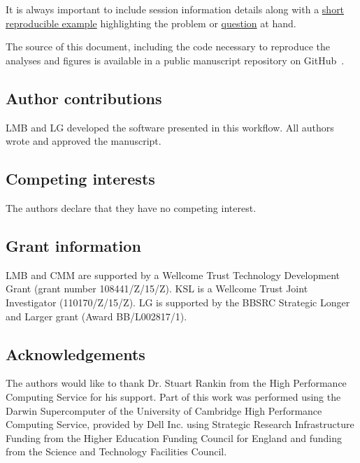 \begin{knitrout}
\color{fgcolor}\begin{kframe}
\begin{alltt}
\hlstd{(}\hlstd{)}
\hlstd{()}
\end{alltt}
\end{kframe}
\end{knitrout}

It is always important to include session information details along
with a \href{http://adv-r.had.co.nz/Reproducibility.html}{short
  reproducible example} highlighting the problem or
\href{https://support.bioconductor.org/}{question} at hand.

The source of this document, including the code necessary to reproduce
the analyses and figures is available in a public manuscript
repository on GitHub~\cite{ghrepo}.

\bigskip

\subsection*{Author contributions}

LMB and LG developed the software presented in this workflow. All
authors wrote and approved the manuscript.

\subsection*{Competing interests}

The authors declare that they have no competing interest.

\subsection*{Grant information}

LMB and CMM are supported by a Wellcome Trust Technology Development
Grant (grant number 108441/Z/15/Z). KSL is a Wellcome Trust Joint
Investigator (110170/Z/15/Z). LG is supported by the BBSRC Strategic
Longer and Larger grant (Award BB/L002817/1).


\subsection*{Acknowledgements}

The authors would like to thank Dr. Stuart Rankin from the High
Performance Computing Service for his support. Part of this work was
performed using the Darwin Supercomputer of the University of
Cambridge High Performance Computing Service, provided by Dell
Inc. using Strategic Research Infrastructure Funding from the Higher
Education Funding Council for England and funding from the Science and
Technology Facilities Council.

